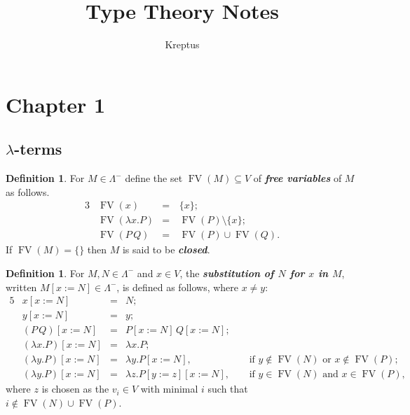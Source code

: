\documentclass[]{article}
\title{Type Theory Notes}
\author{Kreptus}
\theoremstyle{definition}
\newtheorem{definition}[theorem]{Definition}
\newcommand{\FV}{\operatorname{FV}}
\newcommand{\preterm}{\Lambda^{-}}
\newcommand{\deftext}[1]{\textit{\textbf{#1}}}
\begin{document}
\maketitle

\begin{abstract}

\end{abstract}

\section{Chapter 1}
\subsection{$\lambda$-terms}
\begin{definition}\label{free variable}
	For $M \in \preterm$ define the set $\FV(M) \subseteq V$ of \deftext{free variables} of $M$ as follows.
	\begin{alignat*}{3}
		&\FV(x) &=\, &\{x\}; \\
		&\FV(\lambda x. P) &=\, &\FV(P)\setminus \{x\}; \\
		&\FV(P\, Q) &=\, &\FV(P)\cup \FV(Q).
	\end{alignat*}
	If $\FV(M) = \{\}$ then $M$ is said to be \deftext{closed}.
\end{definition}

\begin{definition}\label{substitution}
	For $M, N \in \preterm$ and $x \in V$, the \deftext{substitution of $N$ for $x$ in $M$}, written $M[x:= N]\in \preterm$, is defined as follows, where $x \neq y$:
	\begin{alignat*}{5}
		&x[x:=N] &= &N; &&\\
		&y[x:=N] &= &y; &&\\
		&(P\, Q)[x:=N] &= &P[x:= N]\, Q[x:= N]; &&\\
		&(\lambda x.P)[x:=N] &= &\lambda x. P; &&\\
		&(\lambda y. P)[x:= N] &= &\lambda y. P[x:=N], &&\text{ if } y \notin \FV(N) \text{ or } x \notin \FV(P); \\
		&(\lambda y.P)[x:= N] &= &\lambda z. P[y:= z][x:= N], &&\text{ if } y\in \FV(N) \text{ and } x \in \FV(P),
	\end{alignat*}  
	where $z$ is chosen as the $v_i \in V$ with minimal $i$ such that $i \notin \FV(N) \cup \FV(P)$.
\end{definition}
\end{document}
